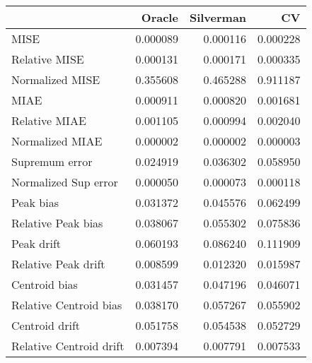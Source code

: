 \begin{tabular}{lrrr}
  \toprule
 & Oracle & Silverman & CV \\ 
  \midrule
MISE & 0.000089 & 0.000116 & 0.000228 \\ 
  Relative MISE & 0.000131 & 0.000171 & 0.000335 \\ 
  Normalized MISE & 0.355608 & 0.465288 & 0.911187 \\ 
  MIAE & 0.000911 & 0.000820 & 0.001681 \\ 
  Relative MIAE & 0.001105 & 0.000994 & 0.002040 \\ 
  Normalized MIAE & 0.000002 & 0.000002 & 0.000003 \\ 
  Supremum error & 0.024919 & 0.036302 & 0.058950 \\ 
  Normalized Sup error & 0.000050 & 0.000073 & 0.000118 \\ 
  Peak bias & 0.031372 & 0.045576 & 0.062499 \\ 
  Relative Peak bias & 0.038067 & 0.055302 & 0.075836 \\ 
  Peak drift & 0.060193 & 0.086240 & 0.111909 \\ 
  Relative Peak drift & 0.008599 & 0.012320 & 0.015987 \\ 
  Centroid bias & 0.031457 & 0.047196 & 0.046071 \\ 
  Relative Centroid bias & 0.038170 & 0.057267 & 0.055902 \\ 
  Centroid drift & 0.051758 & 0.054538 & 0.052729 \\ 
  Relative Centroid drift & 0.007394 & 0.007791 & 0.007533 \\ 
   \bottomrule
\end{tabular}
